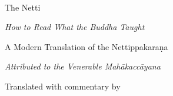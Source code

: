 \begin{titlepage}
\centering

~

\vspace{0.5in}
{\small\scshape \seriesname\par}

\vspace{1in}
{\Huge The Netti\par}
\vspace{8pt}
{\Large\itshape How to Read What the Buddha Taught\par}
\vspace{6pt}
{\small A Modern Translation of the Nettippakaraṇa\par}


{\itshape Attributed to the Venerable Mahākaccāyana\par}

\vspace{8pt}

{\large Translated with commentary by\par}
\vspace{4pt}
{\Large \translatorname\par}


\quad{\large \publisher}\quad{}\\
\vspace{4pt}
{\editionyear\par}
\end{titlepage}
